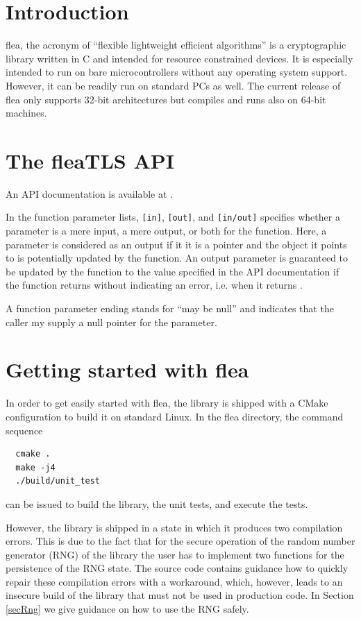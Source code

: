 \documentclass[a4paper,11pt]{scrartcl}
\begin{document}
\newpage

\section{Introduction}
flea, the acronym of ``flexible lightweight efficient algorithms'' is a
cryptographic library written in C and intended for resource
constrained devices. 
It is especially intended to run on bare microcontrollers without
any operating system support. However, it can be readily run on standard PCs as
well. The current release of flea only supports 32-bit architectures but
compiles and runs also on 64-bit machines.


 
  \section{The fleaTLS API}
  An API documentation is available at . 

  In the function parameter lists, \verb#[in]#, \verb#[out]#, and
  \verb#[in/out]# specifies whether a parameter is a mere input, a mere output,
  or both for the function. Here, a parameter is considered as an output if it
  it is a pointer and the object it points to is potentially updated by the
  function. An output parameter is guaranteed to be updated by the function to
  the value specified in the API documentation if the function returns without
  indicating an error, i.e. when it returns .

  A function parameter ending  stands for ``may be null'' and
  indicates that the caller my supply a null pointer for the parameter.
\section{Getting started with flea}

  In order to get easily started with flea, the library is shipped with a CMake
  configuration to build it on standard Linux. In the
  flea directory, the command sequence 
  \begin{verbatim}
  cmake .
  make -j4
  ./build/unit_test
  \end{verbatim}
  can be issued to build the library, the unit tests, and execute the tests.

  However, the library is shipped in a state in which it produces two
  compilation errors. This is due to the fact that for the secure operation of
  the random number generator (RNG) of the library the user has to implement two
  functions for the persistence of the RNG state. The source code contains
  guidance how to quickly repair these compilation errors with a workaround,
  which, however, leads to an insecure build of the library that must not be
  used in production code. In Section \ref{secRng} we give guidance on how to use
  the RNG safely.
\end{document}
